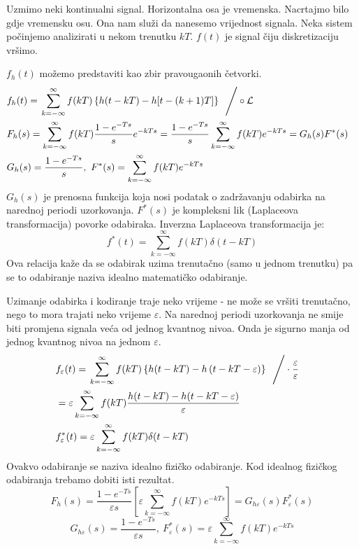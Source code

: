 \documentclass{article}
\newcommand{\suma}{\sum\limits}
\begin{document}
	Uzmimo neki kontinualni signal. Horizontalna osa je vremenska. Nacrtajmo bilo gdje vremensku osu. Ona nam služi da nanesemo vrijednost signala. Neka sistem počinjemo analizirati u nekom trenutku $kT$. $f(t)$ je signal čiju diskretizaciju vršimo. 
	\begin{figure}[H] %
		
	\end{figure}
	$f_h(t)$ možemo predstaviti kao zbir pravougaonih četvorki.
	\begin{eqnarray*}
		&f_h(t) = \left. \suma_{k=-\infty}^\infty f(kT) \left\{h(t-kT) - h[t - (k+1)T]\right\}\ \ \right/ \circ \mathcal{L}& \\
		&F_h(s) = \suma_{k=-\infty}^\infty f(kT) \dfrac{1-e^{-Ts}}{s} e^{-kTs} = \dfrac{1-e^{-Ts}}{s} \suma_{k=-\infty}^\infty f(kT) e^{-kTs} = G_h(s) F^*(s)& \\
		&G_h(s) = \dfrac{1-e^{-Ts}}{s}, \ F^*(s) = \suma_{k=-\infty}^\infty f(kT) e^{-kTs}&
	\end{eqnarray*}
	$G_h(s)$ je prenosna funkcija koja nosi podatak o zadržavanju odabirka na narednoj periodi uzorkovanja. $F^*(s)$ je kompleksni lik (Laplaceova transformacija) povorke odabiraka. Inverzna Laplaceova transformacija je:
	$$f^*(t) = \suma_{k=-\infty}^\infty f(kT) \delta(t-kT)$$
	Ova relacija kaže da se odabirak uzima trenutačno (samo u jednom trenutku) pa se to odabiranje naziva idealno matematičko odabiranje.
	\begin{figure}[H]%
		
		\label{}
	\end{figure}
	Uzimanje odabirka i kodiranje traje neko vrijeme - ne može se vršiti trenutačno, nego to mora trajati neko vrijeme $\varepsilon$. Na narednoj periodi uzorkovanja ne smije biti promjena signala veća od jednog kvantnog nivoa. Onda je sigurno manja od jednog kvantnog nivoa na jednom $\varepsilon$.
	\begin{eqnarray*}
		&f_\varepsilon(t) = \left. \suma_{k=-\infty}^\infty f(kT) \left\{h(t-kT) - h\left(t - kT - \varepsilon \right)\right\}\ \ \right/ \cdot \frac{\varepsilon}{\varepsilon} \\
		&= \varepsilon \suma_{k=-\infty}^\infty f(kT) \dfrac{h(t-kT) - h(t-kT-\varepsilon)}{\varepsilon}& \\
		&f_\varepsilon^*(t) = \varepsilon \suma_{k=-\infty}^\infty f(kT) \delta(t-kT)&
	\end{eqnarray*}
	Ovakvo odabiranje se naziva idealno fizičko odabiranje. Kod idealnog fizičkog odabiranja trebamo dobiti isti rezultat.
	$$F_h(s) = \frac{1-e^{-Ts}}{\varepsilon s} \left[ \varepsilon \suma_{k=-\infty}^\infty f(kT) e^{-kTs} \right] = G_{h\varepsilon}(s) F_\varepsilon^*(s)$$
	$$G_{h\varepsilon}(s) = \frac{1-e^{-Ts}}{\varepsilon s}, \ F_\varepsilon^*(s) = \varepsilon \suma_{k=-\infty}^\infty f(kT) e^{-kTs}$$
	\begin{figure}[H]%
		
		\label{}
	\end{figure}
\end{document}
